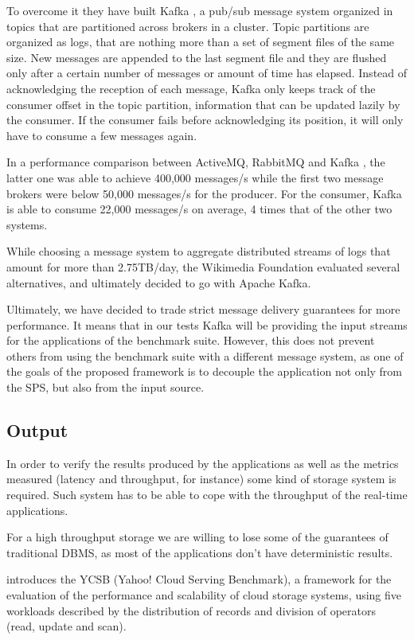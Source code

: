 \documentclass[ppgc,diss,english]{iiufrgs}
\begin{document}
To overcome it they have built Kafka \cite{kreps2011kafka}, a pub/sub message system organized in topics that are partitioned across brokers in a cluster. Topic partitions are organized as logs, that are nothing more than a set of segment files of the same size. New messages are appended to the last segment file and they are flushed only after a certain number of messages or amount of time has elapsed. Instead of acknowledging the reception of each message, Kafka only keeps track of the consumer offset in the topic partition, information that can be updated lazily by the consumer. If the consumer fails before acknowledging its position, it will only have to consume a few messages again.

In a performance comparison between ActiveMQ, RabbitMQ and Kafka \cite{kreps2011kafka}, the latter one was able to achieve 400,000 messages/s while the first two message brokers were below 50,000 messages/s for the producer. For the consumer, Kafka is able to consume 22,000 messages/s on average, 4 times that of the other two systems.

While choosing a message system to aggregate distributed streams of logs that amount for more than 2.75TB/day, the Wikimedia Foundation evaluated \cite{Wikimedia:2014} several alternatives, and ultimately decided to go with Apache Kafka.

Ultimately, we have decided to trade strict message delivery guarantees for more performance. It means that in our tests Kafka will be providing the input streams for the applications of the benchmark suite. However, this does not prevent others from using the benchmark suite with a different message system, as one of the goals of the proposed framework is to decouple the application not only from the SPS, but also from the input source.

\subsection{Output}

In order to verify the results produced by the applications as well as the metrics measured (latency and throughput, for instance) some kind of storage system is required. Such system has to be able to cope with the throughput of the real-time applications.

For a high throughput storage we are willing to lose some of the guarantees of traditional DBMS, as most of the applications don't have deterministic results.

\cite{cooper2010benchmarking} introduces the YCSB (Yahoo! Cloud Serving Benchmark), a framework for the evaluation of the performance and scalability of cloud storage systems, using five workloads described by the distribution of records and division of operators (read, update and scan).
\end{document}
